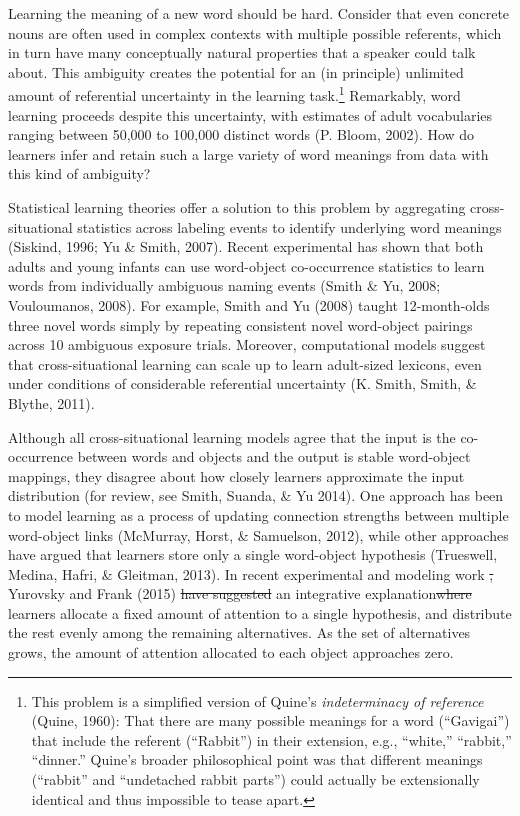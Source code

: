 \documentclass[authoryear, review]{elsarticle}
\providecommand{\DIFaddtex}[1]{{\protect\color{blue}\uwave{#1}}} %
\providecommand{\DIFdeltex}[1]{{\protect\color{red}\sout{#1}}}                      %
\providecommand{\DIFaddbegin}{} %
\providecommand{\DIFaddend}{} %
\providecommand{\DIFdelbegin}{} %
\providecommand{\DIFdelend}{} %
\providecommand{\DIFadd}[1]{\texorpdfstring{\DIFaddtex{#1}}{#1}} %
\providecommand{\DIFdel}[1]{\texorpdfstring{\DIFdeltex{#1}}{}} %
\begin{document}
Learning the meaning of a new word should be hard. Consider that even
concrete nouns are often used in complex contexts with multiple possible
referents, which in turn have many conceptually natural properties that
a speaker could talk about. This ambiguity creates the potential for an
(in principle) unlimited amount of referential uncertainty in the
learning task.\footnote{This problem is a simplified version of Quine's
  \textit{indeterminacy of reference} (Quine, 1960): That there are many
  possible meanings for a word (``Gavigai'') that include the referent
  (``Rabbit'') in their extension, e.g., ``white,'' ``rabbit,''
  ``dinner.'' Quine's broader philosophical point was that different
  meanings (``rabbit'' and ``undetached rabbit parts'') could actually
  be extensionally identical and thus impossible to tease apart.}
Remarkably, word learning proceeds despite this uncertainty, with
estimates of adult vocabularies ranging between 50,000 to 100,000
distinct words (P. Bloom, 2002). How do learners infer and retain such a
large variety of word meanings from data with this kind of ambiguity?

Statistical learning theories offer a solution to this problem by
aggregating cross-situational statistics across labeling events to
identify underlying word meanings (Siskind, 1996; Yu \& Smith, 2007).
Recent experimental \DIFaddbegin \DIFadd{work }\DIFaddend has shown that both adults and young infants
can use word-object co-occurrence statistics to learn words from
individually ambiguous naming events (Smith \& Yu, 2008; Vouloumanos,
2008). For example, Smith and Yu (2008) taught 12-month-olds three novel
words simply by repeating consistent novel word-object pairings across
10 ambiguous exposure trials. Moreover, computational models suggest
that cross-situational learning can scale up to learn adult-sized
lexicons, even under conditions of considerable referential uncertainty
(K. Smith, Smith, \& Blythe, 2011).

Although all cross-situational learning models agree that the input is
the co-occurrence between words and objects and the output is stable
word-object mappings, they disagree about how closely learners
approximate the input distribution (for review, see Smith, Suanda, \& Yu
2014). One approach has been to model learning as a process of updating
connection strengths between multiple word-object links (McMurray,
Horst, \& Samuelson, 2012), while other approaches have argued that
learners store only a single word-object hypothesis (Trueswell, Medina,
Hafri, \& Gleitman, 2013). In recent experimental and modeling work
\DIFdelbegin \DIFdel{,
}\DIFdelend Yurovsky and Frank (2015) \DIFdelbegin \DIFdel{have suggested }\DIFdelend \DIFaddbegin \DIFadd{suggest }\DIFaddend an integrative explanation\DIFdelbegin \DIFdel{where }\DIFdelend \DIFaddbegin \DIFadd{: }\DIFaddend learners
allocate a fixed amount of attention to a single hypothesis, and
distribute the rest evenly among the remaining alternatives. As the set
of alternatives grows, the amount of attention allocated to each object
approaches zero.
\end{document}
